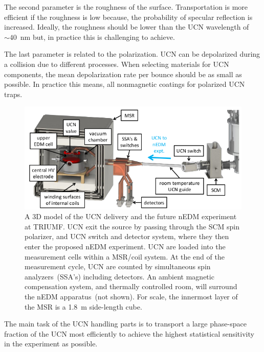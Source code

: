 The second parameter is the roughness of the surface. Transportation
is more efficient if the roughness is low because, the probability of
specular reflection is increased. Ideally, the roughness should be
lower than the UCN wavelength of~$\sim 40$~nm but, in practice this is
challenging to achieve.

The last parameter is related to the polarization. UCN can be
depolarized during a collision due to different processes.
When selecting materials for UCN components, the mean depolarization
rate per bounce should be as small as possible. In practice this
means, all nonmagnetic coatings for polarized UCN traps.
\begin{figure}[h!]
  \centering
  \includegraphics[width=1.0\textwidth]{UCNdelivery.png}
  \caption[3D model of TUCAN's future UCN delivery for the nEDM
  measurement]{A 3D model of the UCN delivery and the future nEDM
    experiment at TRIUMF. UCN exit the source by passing through the
    SCM spin polarizer, and UCN switch and detector system, where they
    then enter the proposed nEDM experiment. UCN are loaded into the
    measurement cells within a MSR/coil system. At the end of the
    measurement cycle, UCN are counted by simultaneous spin
    analyzers~(SSA’s) including detectors. An ambient magnetic
    compensation system, and thermally controlled room, will surround
    the nEDM apparatus~(not shown). For scale, the innermost layer of
    the MSR is a 1.8~m side-length cube.}
  \label{fig:UCNdelivery}
\end{figure}



The main task of the UCN handling parts is to transport a large
phase-space fraction of the UCN most efficiently to achieve the
highest statistical sensitivity in the experiment as possible.

